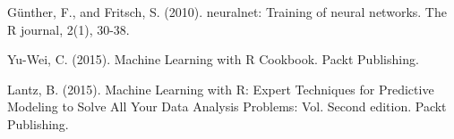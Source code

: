 \documentclass[
  english,
  man]{apa6}
\begin{document}
Günther, F., and Fritsch, S. (2010). neuralnet: Training of neural networks. The R journal, 2(1), 30-38.

Yu-Wei, C. (2015). Machine Learning with R Cookbook. Packt Publishing.

Lantz, B. (2015). Machine Learning with R: Expert Techniques for Predictive Modeling to Solve All Your Data Analysis Problems: Vol. Second edition. Packt Publishing.

\begingroup
\setlength{\parindent}{-0.5in}
\setlength{\leftskip}{0.5in}

\hypertarget{refs}{}

\endgroup
\end{document}
